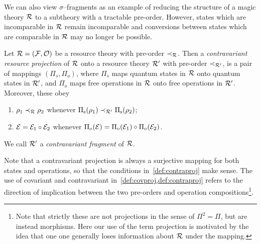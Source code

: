 \documentclass[pra,
aps,
twocolumn,
superscriptaddress,
groupedaddress,
nofootinbib,
reprint
]{revtex4-1}
\begin{document}
We can also view $\sigma$--fragments as an example of reducing the structure of a magic theory $\mathcal{R}$ to a subtheory with a tractable pre-order.
However, states which are incomparable in $\mathcal{R}$ remain incomparable and conversions between states which are comparable in $\mathcal{R}$ may no longer be possible.
\begin{definition}\label{def:contraproj}
	Let $\mathcal{R} = (\mathcal{F}, \mathcal{O})$ be a resource theory with pre-order $\prec_{\mathcal{R}}$. 
Then a \emph{contravariant resource projection} of $\mathcal{R}$ onto a resource theory $\mathcal{R}'$ with pre-order $\prec_{\mathcal{R}'}$, is a pair of mappings $(\Pi_s, \Pi_o)$, where $\Pi_s$ maps quantum states in $\mathcal{R}$ onto quantum states in $\mathcal{R}'$, and $\Pi_o$ maps free operations in $\mathcal{R}$ onto free operations in $\mathcal{R}'$. 
Moreover, these obey
	\begin{enumerate}
        \item $\rho_1 \prec_{\mathcal{R}} \rho_2$ whenever $\Pi_{\rm{s}}(\rho_1) \prec_{\mathcal{R}'} \Pi_{\rm{s}}(\rho_2)$;
        \item $\mathcal{E} = \mathcal{E}_1 \circ \mathcal{E}_2$ whenever $\Pi_{\rm{o}}(\mathcal{E}) = \Pi_{\rm{o}}(\mathcal{E}_1) \circ \Pi_{\rm{o}}(\mathcal{E}_2)$.
    \end{enumerate}
We call $\mathcal{R}'$ a \emph{contravariant fragment} of $\mathcal{R}$.
\end{definition}
Note that a contravariant projection is always a surjective mapping for both states and operations, so that the conditions in~\cref{def:contraproj} make sense.
The use of covariant and contravariant in~\cref{def:covproj,def:contraproj} refers to the direction of implication between the two pre-orders and operation compositions\footnote{Note that strictly these are not projections in the sense of $\Pi^2 = \Pi$, but are instead morphisms. 
Here our use of the term projection is motivated by the idea that one one generally loses information about $\mathcal{R}$ under the mapping.}.
\end{document}
